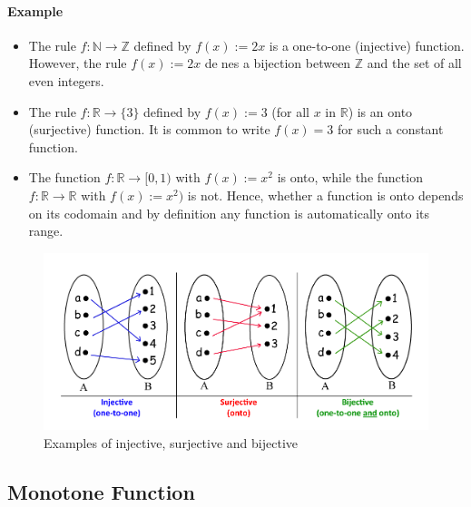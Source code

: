 \documentclass[12pt]{article}
\begin{document}
\paragraph{Example}
\begin{itemize} 
    \item The rule $f : \mathbb{N} \rightarrow \mathbb{Z}$ defined by $f(x) := 2x$ is a one-to-one
    (injective) function. However, the rule $f(x) := 2x$ denes a bijection between $\mathbb{Z}$ and the set
    of all even integers.
    \item The rule $f : \mathbb{R} \rightarrow \{3\}$ defined by $f(x) := 3$ (for all $x$ in $\mathbb{R}$) is
    an onto (surjective) function. It is common to write $f(x) = 3$ for such a constant function.
    \item The function $f : \mathbb{R} \rightarrow [0,1)$ with $f(x) := x^2$ is onto, while the
    function $f : \mathbb{R} \rightarrow \mathbb{R}$ with $f(x) := x^2)$ is not. Hence, whether a function is onto depends on its codomain
    and by definition any function is automatically onto its range.
\end{itemize}

\begin{figure} 
    \centering
    \includegraphics[width=0.9\linewidth]{images/injective-surjective-bijective.png}
    \caption{Examples of injective, surjective and bijective}
\end{figure}

\subsection{Monotone Function}
\end{document}
